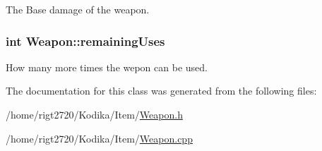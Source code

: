 The Base damage of the weapon. 

\hypertarget{classWeapon_abbc826be5477aa791910f871d76a1da2}{
\subsubsection[{remaining\-Uses}]{\setlength{\rightskip}{0pt plus 5cm}int Weapon\-::remaining\-Uses\hspace{0.3cm}{\ttfamily [protected]}}}\label{classWeapon_abbc826be5477aa791910f871d76a1da2}


How many more times the wepon can be used. 



The documentation for this class was generated from the following files\-:\begin{DoxyCompactItemize}
\item 
/home/rigt2720/\-Kodika/\-Item/\hyperlink{Weapon_8h}{Weapon.\-h}\item 
/home/rigt2720/\-Kodika/\-Item/\hyperlink{Weapon_8cpp}{Weapon.\-cpp}\end{DoxyCompactItemize}
